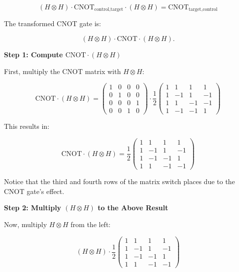 \[
  (H \otimes H) \cdot \text{CNOT}_{\text{control,target}} \cdot (H \otimes H)
  = \text{CNOT}_{\text{target,control}}
\]


The transformed CNOT gate is:

\[
  (H \otimes H) \cdot \text{CNOT} \cdot (H \otimes H).
\]

\vspace{0.3cm}

\textbf{Step 1: Compute $\text{CNOT} \cdot (H \otimes H)$}

First, multiply the CNOT matrix with $H \otimes H$:

\[
  \text{CNOT} \cdot (H \otimes H) = \begin{pmatrix}
    1 & 0 & 0 & 0 \\
    0 & 1 & 0 & 0 \\
    0 & 0 & 0 & 1 \\
    0 & 0 & 1 & 0
    \end{pmatrix} \cdot \frac{1}{2} \begin{pmatrix}
    1 & 1 & 1 & 1 \\
    1 & -1 & 1 & -1 \\
    1 & 1 & -1 & -1 \\
    1 & -1 & -1 & 1
  \end{pmatrix}
\]

This results in:

\[
  \text{CNOT} \cdot (H \otimes H) = \frac{1}{2} \begin{pmatrix}
    1 & 1 & 1 & 1 \\
    1 & -1 & 1 & -1 \\
    1 & -1 & -1 & 1 \\
    1 & 1 & -1 & -1
  \end{pmatrix}
\]

Notice that the third and fourth rows of the matrix switch places due to the
CNOT gate's effect.

\vspace{0.3cm}

\textbf{Step 2: Multiply $(H \otimes H)$ to the Above Result}

Now, multiply $H \otimes H$ from the left:

\[
  (H \otimes H) \cdot \frac{1}{2} \begin{pmatrix}
    1 & 1 & 1 & 1 \\
    1 & -1 & 1 & -1 \\
    1 & -1 & -1 & 1 \\
    1 & 1 & -1 & -1
  \end{pmatrix}
\]


